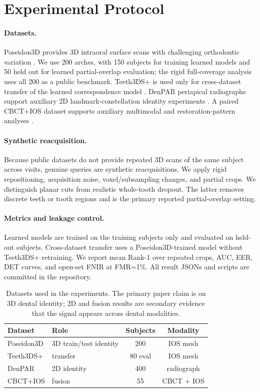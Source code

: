 \documentclass[10pt,twocolumn]{article}
\begin{document}
\section{Experimental Protocol}
\paragraph{Datasets.}
Poseidon3D provides 3D intraoral surface scans with challenging orthodontic variation \citep{kubik2024poseidon}. We use 200 arches, with 150 subjects for training learned models and 50 held out for learned partial-overlap evaluation; the rigid full-coverage analysis uses all 200 as a public benchmark. Teeth3DS+ is used only for cross-dataset transfer of the learned correspondence model \citep{ben2022teeth3ds}. DenPAR periapical radiographs support auxiliary 2D landmark-constellation identity experiments \citep{rasnayaka2025denpar}. A paired CBCT+IOS dataset supports auxiliary multimodal and restoration-pattern analyses \citep{li2024cbctios}.

\paragraph{Synthetic reacquisition.}
Because public datasets do not provide repeated 3D scans of the same subject across visits, genuine queries are synthetic reacquisitions. We apply rigid repositioning, acquisition noise, voxel/subsampling changes, and partial crops. We distinguish planar cuts from realistic whole-tooth dropout. The latter removes discrete teeth or tooth regions and is the primary reported partial-overlap setting.

\paragraph{Metrics and leakage control.}
Learned models are trained on the training subjects only and evaluated on held-out subjects. Cross-dataset transfer uses a Poseidon3D-trained model without Teeth3DS+ retraining. We report mean Rank-1 over repeated crops, AUC, EER, DET curves, and open-set FNIR at FMR=1\%. All result JSONs and scripts are committed in the repository.

\begin{table}[t]
\centering
\scriptsize
\setlength{\tabcolsep}{3pt}
\begin{tabular}{llcc}
\toprule
Dataset & Role & Subjects & Modality \\
\midrule
Poseidon3D & 3D train/test identity & 200 & IOS mesh \\
Teeth3DS+ & transfer & 80 eval & IOS mesh \\
DenPAR & 2D identity & 400 & radiograph \\
CBCT+IOS & fusion & 55 & CBCT + IOS \\
\bottomrule
\end{tabular}
\caption{Datasets used in the experiments. The primary paper claim is on 3D dental identity; 2D and fusion results are secondary evidence that the signal appears across dental modalities.}
\label{tab:datasets}
\end{table}
\end{document}
